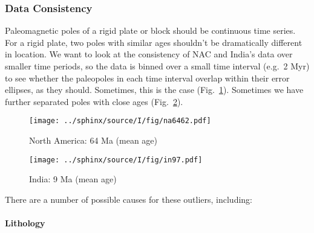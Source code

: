 \subsubsection{Data Consistency}

Paleomagnetic poles of a rigid plate or block should be continuous time series.
For a rigid plate, two poles with similar ages shouldn't be dramatically
different in location. We want to look at the consistency of NAC and India's
data over smaller time periods, so the data is binned over a small time interval
(e.g.\ 2 Myr) to see whether the paleopoles in each time interval overlap within
their error ellipses, as they should. Sometimes, this is the case
(Fig.~\ref{Fig:chap_intro_na6462agemean}). Sometimes we have further separated
poles with close ages (Fig.~\ref{Fig:chap_intro_in97agemean}).

\begin{figure*}[tbp]
  \captionsetup[subfigure]{labelformat=empty,aboveskip=-6pt,belowskip=-6pt}
  \centering
  \begin{subfigure}[htbp]{.49\textwidth}
    \captionsetup{skip=0pt}  %
    \centering
    \texttt{[image: ../sphinx/source/I/fig/na6462.pdf]}
    \caption{North America: 64 Ma (mean age)}\label{Fig:chap_intro_na6462agemean}
  \end{subfigure}
  \begin{subfigure}[htbp]{.49\textwidth}
    \captionsetup{skip=0pt}
    \centering
    \texttt{[image: ../sphinx/source/I/fig/in97.pdf]}
    \caption{India: 9 Ma (mean age)}\label{Fig:chap_intro_in97agemean}
  \end{subfigure}
  \caption[Example of AMP Moving Averaging Effects]{Overlapping and further
  separated paleomagnetic poles of NAC\@ and India. The oval ellipses are their
  95\% confidence errors. The labels are their result number given in GPMDB
  4.6b.}\label{Fig:chap_intro_ma-amp}
\end{figure*}

There are a number of possible causes for these outliers, including:

\paragraph{Lithology}

